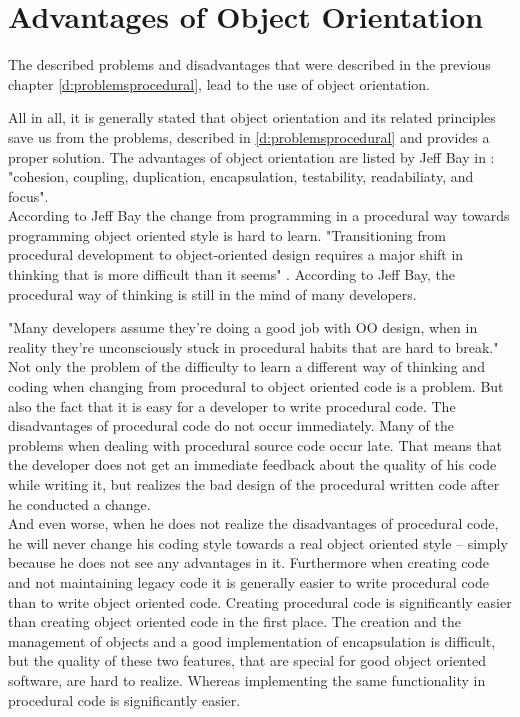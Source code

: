 \section{Advantages of Object Orientation}
The described problems and disadvantages that were described in the previous chapter \ref{d:problemsprocedural}, lead to the use of object orientation. 

All in all, it is generally stated that object orientation and its related principles save us from the problems, described in \ref{d:problemsprocedural} and provides a proper solution. The advantages of object orientation are listed by Jeff Bay in \cite[p. 70]{oc2008}: "cohesion, coupling, duplication, encapsulation, testability, readabiliaty, and focus".
\\

According to Jeff Bay the change from programming in a procedural way towards programming object oriented style is hard to learn. "Transitioning from procedural development to object-oriented design requires a major shift in thinking that is more difficult than it seems" \cite[p. 70]{oc2008}. 
According to Jeff Bay, the procedural way of thinking is still in the mind of many developers.

"Many developers assume they’re doing a good job with OO design, when in reality they’re unconsciously
stuck in procedural habits that are hard to break." \cite[p. 70]{oc2008} Not only the problem of the difficulty to learn a different way of thinking and coding when changing from procedural to object oriented code is a problem. But also the fact that it is easy for a developer to write procedural code. The disadvantages of procedural code do not occur immediately. Many of the problems when dealing with procedural source code occur late. That means that the developer does not get an immediate feedback about the quality of his code while writing it, but realizes the bad design of the procedural written code after he conducted a change. 
\\

And even worse, when he does not realize the disadvantages of procedural code, he will never change his coding style towards a real object oriented style -- simply because he does not see any advantages in it. Furthermore when creating code and not maintaining legacy code it is generally easier to write procedural code than to write object oriented code. Creating procedural code is significantly easier than creating object oriented code in the first place. The creation and the management of objects and a good implementation of encapsulation is difficult, but the quality of these two features, that are special for good object oriented software, are hard to realize. Whereas implementing the same functionality in procedural code is significantly easier.


